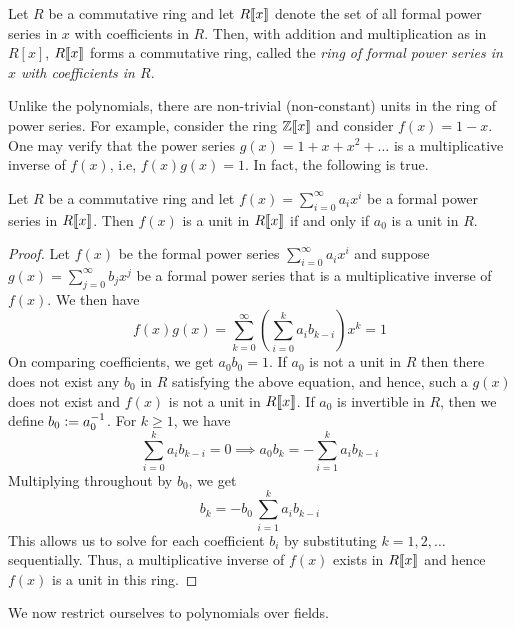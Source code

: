 \begin{prop} \label{prop:ring-of-power-series}
    Let $R$ be a commutative ring and let $R\llbracket x \rrbracket$ denote the set of all formal power series in $x$ with coefficients in $R$. Then, with addition and multiplication as in $R[x]$, $R \llbracket x \rrbracket$ forms a commutative ring, called the \emph{ring of formal power series in $x$ with coefficients in $R$}.
\end{prop}

Unlike the polynomials, there are non-trivial (non-constant) units in the ring of power series. For example, consider the ring $\mathbb{Z}\llbracket x \rrbracket$ and consider $f(x) = 1 - x$. One may verify that the power series $g(x) = 1 + x + x^2 + \ldots$ is a multiplicative inverse of $f(x)$, i.e, $f(x)g(x) = 1$. In fact, the following is true.
\begin{prop} \label{prop:unit-in-power-series}
    Let $R$ be a commutative ring and let $f(x) = \sum_{i=0}^{\infty} a_ix^i$ be a formal power series in $R\llbracket x \rrbracket$. Then $f(x)$ is a unit in $R\llbracket x \rrbracket$ if and only if $a_0$ is a unit in $R$.
\end{prop}
\begin{proof}
    Let $f(x)$ be the formal power series $\sum_{i=0}^{\infty}a_ix^i$ and suppose $g(x) = \sum_{j=0}^{\infty} b_jx^j$ be a formal power series that is a multiplicative inverse of $f(x)$. We then have
    \[
        f(x)g(x) = \sum_{k=0}^{\infty} \left( \sum_{i=0}^k a_ib_{k-i} \right) x^k = 1
    \]
    On comparing coefficients, we get $a_0b_0 = 1$. If $a_0$ is not a unit in $R$ then there does not exist any $b_0$ in $R$ satisfying the above equation, and hence, such a $g(x)$ does not exist and $f(x)$ is not a unit in $R\llbracket x \rrbracket$. If $a_0$ is invertible in $R$, then we define $b_0 \vcentcolon= a_0^{-1}$. For $k \geq 1$, we have
    \[
        \sum_{i=0}^k a_ib_{k-i} = 0 \implies a_0b_k = - \sum_{i=1}^k a_ib_{k-i}
    \]
    Multiplying throughout by $b_0$, we get
    \[
        b_k = -b_0\, \sum_{i=1}^k a_ib_{k-i}
    \]
    This allows us to solve for each coefficient $b_i$ by substituting $k=1,2,\ldots$ sequentially. Thus, a multiplicative inverse of $f(x)$ exists in $R\llbracket x \rrbracket$ and hence $f(x)$ is a unit in this ring.
\end{proof}

We now restrict ourselves to polynomials over fields. 

